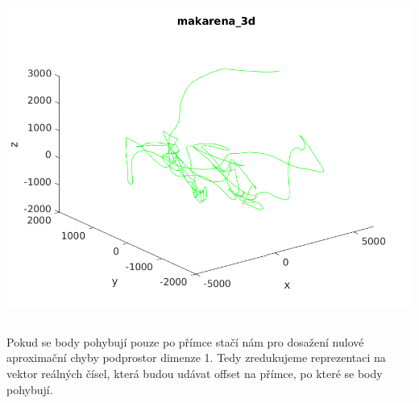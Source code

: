 \documentclass[10pt,a4paper,openright]{article}
\begin{document}
\includegraphics[scale=0.5]{makarena_3d.png}\\

\subsection{}
Pokud se body pohybují pouze po přímce stačí nám pro dosažení nulové aproximační chyby podprostor dimenze 1.
Tedy zredukujeme reprezentaci na vektor reálných čísel, která budou udávat offset na přímce, po které se body pohybují.

\subsection{}
\end{document}
